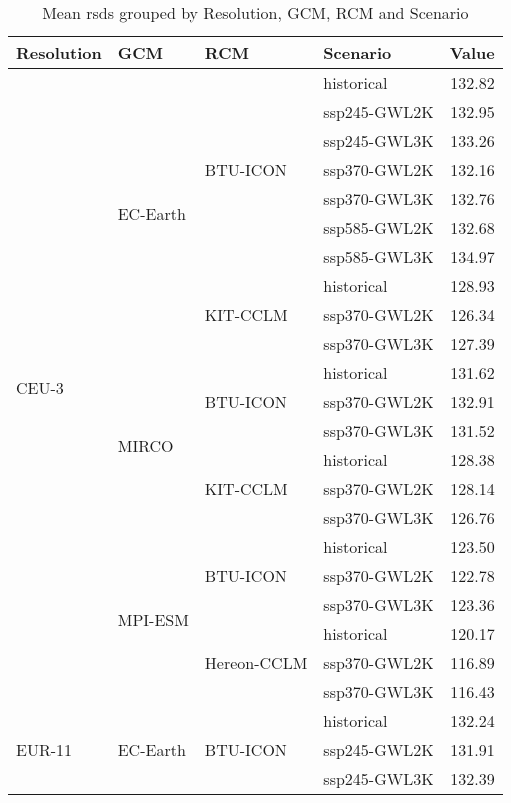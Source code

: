 \begin{table}[!htbp]
\centering
\footnotesize
\caption{Mean rsds grouped by Resolution, GCM, RCM and Scenario}
\label{Table:rsds_mean_values}
\begin{tabular}{lll|l|r}
\toprule
Resolution & GCM & RCM & Scenario & Value \\
\midrule
\multirow{22}{*}{CEU-3} & \multirow{10}{*}{EC-Earth} & \multirow{7}{*}{BTU-ICON} & historical & 132.82 \\
 &  &  & ssp245-GWL2K & 132.95 \\
 &  &  & ssp245-GWL3K & 133.26 \\
 &  &  & ssp370-GWL2K & 132.16 \\
 &  &  & ssp370-GWL3K & 132.76 \\
 &  &  & ssp585-GWL2K & 132.68 \\
 &  &  & ssp585-GWL3K & 134.97 \\
\cmidrule(lr){3-5}
 &  & \multirow{3}{*}{KIT-CCLM} & historical & 128.93 \\
 &  &  & ssp370-GWL2K & 126.34 \\
 &  &  & ssp370-GWL3K & 127.39 \\
\cmidrule(lr){3-5}
\cmidrule(lr){2-5}
 & \multirow{6}{*}{MIRCO} & \multirow{3}{*}{BTU-ICON} & historical & 131.62 \\
 &  &  & ssp370-GWL2K & 132.91 \\
 &  &  & ssp370-GWL3K & 131.52 \\
\cmidrule(lr){3-5}
 &  & \multirow{3}{*}{KIT-CCLM} & historical & 128.38 \\
 &  &  & ssp370-GWL2K & 128.14 \\
 &  &  & ssp370-GWL3K & 126.76 \\
\cmidrule(lr){3-5}
\cmidrule(lr){2-5}
 & \multirow{6}{*}{MPI-ESM} & \multirow{3}{*}{BTU-ICON} & historical & 123.50 \\
 &  &  & ssp370-GWL2K & 122.78 \\
 &  &  & ssp370-GWL3K & 123.36 \\
\cmidrule(lr){3-5}
 &  & \multirow{3}{*}{Hereon-CCLM} & historical & 120.17 \\
 &  &  & ssp370-GWL2K & 116.89 \\
 &  &  & ssp370-GWL3K & 116.43 \\
\midrule
\multirow{22}{*}{EUR-11} & \multirow{10}{*}{EC-Earth} & \multirow{7}{*}{BTU-ICON} & historical & 132.24 \\
 &  &  & ssp245-GWL2K & 131.91 \\
 &  &  & ssp245-GWL3K & 132.39 \\

\end{tabular}
\end{table}
